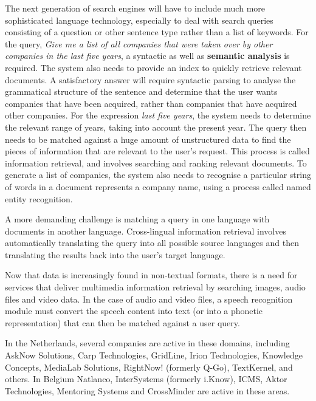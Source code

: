 \begin{multicols}{2}

The next generation of search engines will have to include much more sophisticated language technology, especially to deal with search queries consisting of a question or other sentence type rather than a list of keywords. For the query, \textit{Give me a list of all companies that were taken over by other companies in the last five years}, a syntactic as well as \textbf{semantic analysis} is required. The system also needs to provide an index to quickly retrieve relevant documents. A satisfactory answer will require syntactic parsing to analyse the grammatical structure of the sentence and determine that the user wants companies that have been acquired, rather than companies that have acquired other companies. For the expression \textit{last five years}, the system needs to determine the relevant range of years, taking into account the present year. The query then needs to be matched against a huge amount of unstructured data to find the pieces of information that are relevant to the user’s request. This process is called information retrieval, and involves searching and ranking relevant documents. To generate a list of companies, the system also needs to recognise a particular string of words in a document represents a company name, using a process called named entity recognition.

A more demanding challenge is matching a query in one language with documents in another language. Cross-lingual information retrieval involves automatically translating the query into all possible source languages and then translating the results back into the user's target language.

Now that data is increasingly found in non-textual formats, there is a need for services that deliver multimedia information retrieval by searching images, audio files and video data. In the case of audio and video files, a speech recognition module must convert the speech content into text (or into a phonetic representation) that can then be matched against a user query.

 In the Netherlands, several companies are active in these domains, including AskNow Solutions, Carp Technologies, GridLine, Irion Technologies, Knowledge Concepts, MediaLab Solutions, RightNow! (formerly Q-Go), TextKernel, and others. In Belgium Natlanco, InterSystems (formerly i.Know), ICMS, Aktor Technologies, Mentoring Systems and CrossMinder are active in these areas.


\end{multicols}
